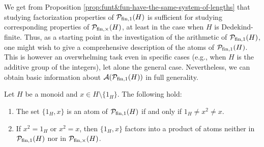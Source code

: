 %
We get from Proposition \ref{prop:funt&fun-have-the-same-system-of-lengths} that studying factorization properties of $\mathcal{P}_{\textrm{fin}, 1}(H)$ is sufficient for studying corresponding properties of $\mathcal{P}_{\textrm{fin}, \times}(H)$, at least in the case when $H$ is Dedekind-finite.
Thus, as a starting point in the investigation of the arithmetic of $\mathcal{P}_{\textrm{fin}, 1}(H)$, one might wish to give a comprehensive description of
the atoms of $\mathcal{P}_{\textrm{fin}, 1}(H)$.
This is however an overwhelming task even in specific cases (e.g., when $H$ is the additive group of the integers), let alone the general case. Nevertheless, we can obtain basic information about $\mathcal{A}(\mathcal{P}_{\textrm{fin}, 1}(H))$ in full generality.
%
%
\begin{lemma}\label{lem:2-elt-atoms}
Let $H$ be a monoid and $x \in H \setminus \{1_H\}$.
The following hold:
\begin{enumerate}[label={\rm (\roman{*})}]
%
\item\label{it:lem:2-elt-atoms(i)} The set $\{1_H, x\}$ is an atom of $\mathcal{P}_{\textrm{fin}, 1}(H)$ if and only if $1_H \ne x^2 \ne x$.
\item\label{it:lem:2-elt-atoms(ii)} If $x^2=1_H$ or $x^2=x$, then $\{1_H,x\}$ factors into a product of atoms neither in $\mathcal{P}_{\textrm{fin},1}(H)$ nor in $\mathcal{P}_{\textrm{fin}, \times}(H)$.
\end{enumerate}
\end{lemma}
%
